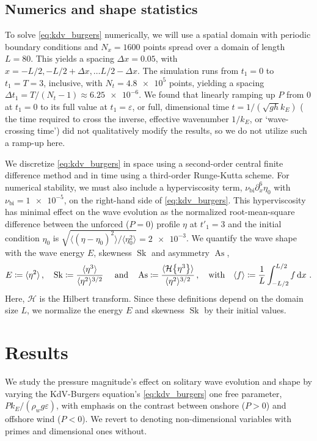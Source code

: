 \documentclass{jfm}
\DeclareMathOperator{\Sk}{Sk}
\DeclareMathOperator{\As}{As}
\newcommand{\hilbert}{\mathcal{H}}
\renewcommand*{\epsilon}{\varepsilon}
\begin{document}
\subsection{Numerics and shape statistics}
To solve \cref{eq:kdv_burgers} numerically,
we will use a spatial domain with periodic boundary conditions and $N_x
= 1600$ points spread over a domain of length $L = 80$.
This yields a spacing $\Delta x = 0.05$, with $x = -L/2,
-L/2 + \Delta x, \ldots L/2 - \Delta x$.
The simulation runs from $t_1 = 0$ to $t_1 = T = 3$, inclusive, with
$N_t = \num{4.8e5}$ points, yielding a spacing $\Delta t_1 = T/(N_t-1)
\approx \num{6.25e-6}$.
We found that linearly ramping up $P$ from $0$ at $t_1=0$ to its full
value at $t_1 = \epsilon$, or full, dimensional time $t = 1/(\sqrt{gh}
k_E)$ (\ie{} the time required to cross the inverse, effective
wavenumber $1/k_E$, or `wave-crossing time') did not qualitatively
modify the results, so we do not utilize such a ramp-up here.

We discretize \cref{eq:kdv_burgers} in space using a
second-order central finite difference method and in time using a
third-order Runge-Kutta scheme.
For numerical stability, we must also include a hyperviscosity term,
$\nu_{\text{bi}} \partial_x^6 \eta_0$ with $\nu_{\text{bi}} =
\num{1e-5}$, on the right-hand side of \cref{eq:kdv_burgers}.
This hyperviscosity has minimal effect on the wave evolution as the
normalized root-mean-square difference between the unforced ($P=0$)
profile $\eta$ at $t'_1=3$ and the initial condition $\eta_0$ is
$\sqrt{\langle (\eta - \eta_0)^2 \rangle/ \langle \eta_0^2 \rangle} =
\num{2e-3}$.
We quantify the wave shape with the wave energy $E$, skewness $\Sk$ and
asymmetry $\As$,
\begin{equation}
  E \coloneqq \langle \eta^2 \rangle \,, \quad
  \Sk \coloneqq \frac{\langle \eta^3 \rangle}{\langle \eta^2
  \rangle^{3/2}} \
  \qq{and}
  \As \coloneqq \frac{\langle \hilbert \Bqty{\eta^3} \rangle}{\langle
    \eta^2 \rangle^{3/2}}
  \,, \qq{with}
  \langle f \rangle \coloneqq \frac{1}{L} \int_{-L/2}^{L/2} f
  \dd{x} \,.
  \label{eq:shape_stats_def}
\end{equation}
Here, $\hilbert$ is the Hilbert transform.
Since these definitions depend on the domain size $L$, we normalize the
energy $E$ and skewness $\Sk$ by their initial values.

\vspace{-0.5cm}
\section{\label{sec:results} Results}
We study the pressure magnitude's effect on solitary
wave evolution and shape by varying the KdV-Burgers equation's
\cref{eq:kdv_burgers} one free parameter, $P k_E/(\rho_w g \epsilon)$,
with emphasis on the contrast between onshore ($P > 0$) and offshore
wind ($P < 0$).
We revert to denoting non-dimensional variables with primes and
dimensional ones without.
\end{document}
